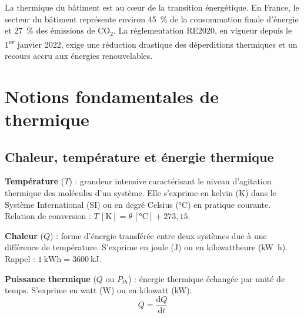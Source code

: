 La thermique du bâtiment est au cœur de la transition énergétique. En France, le secteur du
bâtiment représente environ \SI{45}{\percent} de la consommation finale d'énergie et
\SI{27}{\percent} des émissions de \(\mathrm{CO_2}\). La réglementation RE2020, en vigueur
depuis le 1\textsuperscript{er} janvier 2022, exige une réduction drastique des déperditions
thermiques et un recours accru aux énergies renouvelables.

\section{Notions fondamentales de thermique}

\subsection{Chaleur, température et énergie thermique}

\begin{definition}
  \textbf{Température} (\(T\)) : grandeur intensive caractérisant le niveau d'agitation
  thermique des molécules d'un système. Elle s'exprime en kelvin (\si{\kelvin}) dans le
  Système International (SI) ou en degré Celsius (\si{\degreeCelsius}) en pratique courante.
  Relation de conversion : \(T\,[\si{\kelvin}] = \theta\,[\si{\degreeCelsius}] + 273{,}15\).
\end{definition}

\begin{definition}
  \textbf{Chaleur} (\(Q\)) : forme d'énergie transférée entre deux systèmes due à une
  différence de température. S'exprime en joule (\si{\joule}) ou en kilowattheure
  (\si{\kilo\watt\hour}). Rappel : \(\SI{1}{\kilo\watt\hour} = \SI{3600}{\kilo\joule}\).
\end{definition}

\begin{definition}
  \textbf{Puissance thermique} (\(\dot{Q}\) ou \(P_{th}\)) : énergie thermique échangée
  par unité de temps. S'exprime en watt (\si{\watt}) ou en kilowatt (\si{\kilo\watt}).
  \[
    \dot{Q} = \frac{\mathrm{d}Q}{\mathrm{d}t}
  \]
\end{definition}

